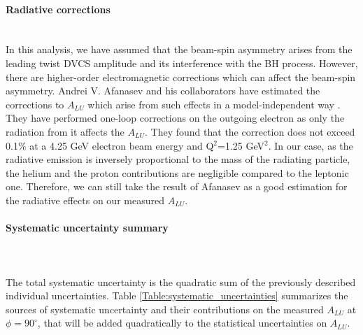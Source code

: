 \paragraph{Radiative corrections}
~\\

In this analysis, we have assumed that the beam-spin asymmetry arises from the 
leading twist DVCS amplitude and its interference with the BH process.  
However, there are higher-order electromagnetic corrections which can affect 
the beam-spin asymmetry. Andrei V. Afanasev and his collaborators have 
estimated the corrections to $A_{LU}$ which arise from such effects in a 
model-independent way \cite{Afanasev}. They have performed one-loop corrections 
on the outgoing electron as only the radiation from it affects the $A_{LU}$.  
They found that the correction does not exceed 0.1$\%$ at a 4.25 GeV electron 
beam energy and Q$^{2}$=1.25 GeV$^{2}$. In our case, as the radiative emission 
is inversely proportional to the mass of the radiating particle, the helium and 
the proton contributions are negligible compared to the leptonic one.  
Therefore, we can still take the result of Afanasev as a good estimation for 
the radiative  effects on our measured $A_{LU}$.\\



\paragraph{Systematic uncertainty summary}
~\\
~\\
The total systematic uncertainty is the quadratic sum of the previously 
described individual uncertainties. Table \ref{Table:systematic_uncertainties} 
summarizes the sources of systematic uncertainty and their contributions on the 
measured $A_{LU}$ at $\phi = 90^{\circ}$, that will be added quadratically to 
the statistical uncertainties on $A_{LU}$. 

